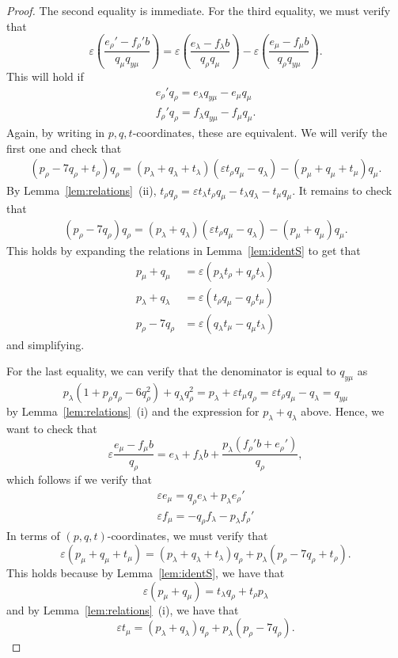 \documentclass[11pt, reqno]{amsart}
\theoremstyle{remark}
\numberwithin{equation}{subsection}
\numberwithin{figure}{section}
\theoremstyle{customremark}
\newcommand{\la}{{\lambda}}
\newcommand{\eps}{\varepsilon}
\begin{document}
\begin{proof}
    The second equality is immediate. For the third equality, we must verify that 
    \[ \eps (\frac{e_\rho'-f_\rho'b}{q_\mu q_{y\mu}})=\eps (\frac{e_\la-f_\la b}{q_\rho q_\mu})-\eps (\frac{e_\mu-f_\mu b}{q_\rho q_{y\mu}}).\]
    This will hold if
    \begin{align*}
        e_\rho'q_\rho=e_\la q_{y\mu}- e_\mu q_\mu \\
         f_\rho' q_\rho= f_\la q_{y\mu}- f_\mu q_\mu.
    \end{align*}
    Again, by writing in $p,q,t$-coordinates, 
    these are equivalent. We will verify the first one and check that 
    \begin{align*}
        (p_\rho-7q_\rho+t_\rho)q_\rho=(p_\la+q_\la+ t_\la)(\eps t_\rho q_\mu-q_\la)-(p_\mu+q_\mu+ t_\mu)q_\mu.
    \end{align*}
    By Lemma~\ref{lem:relations}~(ii),
    $t_\rho q_\rho=\eps t_\la t_\rho q_\mu-t_\la q_\la-t_\mu q_\mu.$
    It remains to check that
   \begin{align*}
        (p_\rho-7q_\rho)q_\rho=(p_\la+q_\la)(\eps t_\rho q_\mu-q_\la)-(p_\mu+q_\mu)q_\mu.
    \end{align*}
    This holds by expanding the relations in Lemma~\ref{lem:identS} to get that 
    \begin{align*}
        p_\mu+q_\mu&=\eps(p_\la t_\rho+q_\rho t_\la) \\
        p_\la+q_\la&=\eps(t_\rho q_\mu-q_\rho t_\mu) \\
        p_\rho-7q_\rho&=\eps(q_\la t_\mu-q_\mu t_\la)
    \end{align*}
    and simplifying. 


    For the last equality, we can verify that the denominator is equal to $q_{y\mu}$ as 
    \[ p_\la(1+p_\rho q_\rho-6q_\rho^2)+q_\la q_\rho^2=p_\la+\eps t_\mu q_\rho=\eps t_\rho q_\mu-q_\la=q_{y\mu}\]
    by Lemma~\ref{lem:relations}~(i) and the expression for $p_\la+q_\la$ above. 
    Hence, we want to check that 
    \[ \eps \frac{e_\mu-f_\mu b}{q_\rho}=e_\la+f_\la b+\frac{p_\la(f_\rho'b+e_\rho')}{q_\rho},\]
    which follows if we verify that
    \begin{align*}
     \eps e_\mu= q_\rho e_\la+p_\la e_\rho' \\
     \eps f_\mu=-q_\rho f_\la -p_\la f_\rho'
    \end{align*}
    In terms of $(p,q,t)$-coordinates, we must verify that 
    \[ \eps (p_\mu+q_\mu+ t_\mu)=(p_\la+q_\la+ t_\la)q_\rho+p_\la(p_\rho-7q_\rho+t_\rho).\]
    This holds because by Lemma~\ref{lem:identS},
    we have that 
    \[ \eps(p_\mu+q_\mu)= t_\la q_\rho+ t_\rho p_\la\] and by Lemma~\ref{lem:relations}~(i), we have that 
    \[ \eps t_\mu=(p_\la+q_\la)q_\rho+p_\la(p_\rho-7q_\rho).\]
\end{proof}
\end{document}
